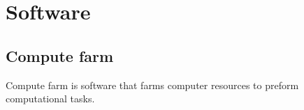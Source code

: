 \chapter{Software}
\section{Compute farm}

Compute farm is software that farms computer resources to preform computational tasks. 
